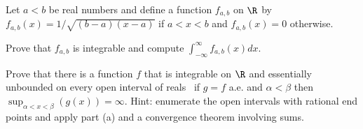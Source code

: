 Let $a<b$ be real numbers and define a function $f_{a,b}$ on $\R$ by
$f_{a,b}(x)=1/\sqrt{(b-a)(x-a)}$ if $a<x<b$ and $f_{a,b}(x)=0$
otherwise.
\begin{alist}
\item Prove that $f_{a,b}$ is integrable and compute
$\int_{-\infty}^{\infty}f_{a,b}(x)dx$.
\item Prove that there is a function $f$ that is integrable on $\R$
and essentially unbounded on every open interval of reals \ie\ if
$g=f$ a.e. and $\alpha<\beta$ then
$\sup_{\alpha<x<\beta}(g(x))=\infty$. Hint: enumerate the open
intervals with rational end points and apply part (a) and a
convergence theorem involving sums.
\end{alist}
